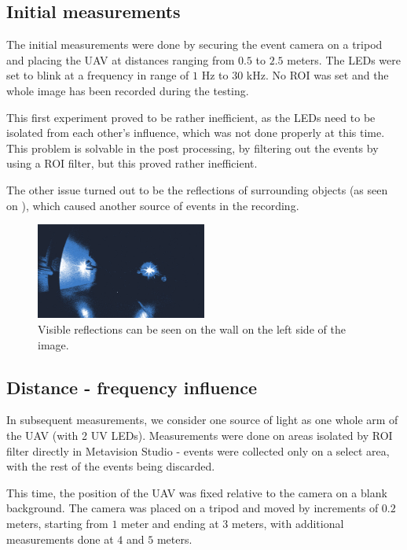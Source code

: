 \subsection{Initial measurements}

The initial measurements were done by securing the event camera on a tripod and placing the UAV at distances ranging from
$0.5$ to $2.5$ meters. The LEDs were set to blink at a frequency in range of $1$ Hz to $30$ kHz. No \ac{ROI} was set
and the whole image has been recorded during the testing.

This first experiment proved to be rather inefficient, as the LEDs need to be isolated from each other's influence, which
was not done properly at this time. This problem is solvable in the post processing, by filtering out the events
by using a ROI filter, but this proved rather inefficient.

The other issue turned out to be the reflections of surrounding objects (as seen on ), which caused
another source of events in the recording.

\begin{figure}[htbp]
  \centering
  \includegraphics[width=0.5\textwidth]{./fig/photos/meas1.png}
  \caption{Visible reflections can be seen on the wall on the left side of the image.}
  \label{fig:meas1}
\end{figure}

\subsection{Distance - frequency influence}

In subsequent measurements, we consider one source of light as one whole arm of the UAV (with 2 UV LEDs). Measurements were
done on areas isolated by ROI filter directly in Metavision Studio - events were collected only on a select area, with the
rest of the events being discarded.

This time, the position of the UAV was fixed relative to the camera on a blank background. The camera was placed on a tripod
and moved by increments of $0.2$ meters, starting from $1$ meter and ending at $3$ meters, with additional measurements done
at $4$ and $5$ meters.

